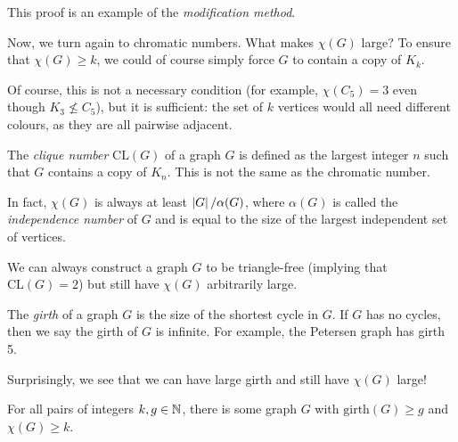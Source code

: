 \documentclass{article}
\begin{document}
\begin{note}
	This proof is an example of the \textit{modification method}.
\end{note}

Now, we turn again to chromatic numbers. What makes $\chi(G)$ large? To ensure that $\chi(G) \geq k$, we could of course simply force $G$ to contain a copy of $K_k$.

Of course, this is not a necessary condition (for example, $\chi(C_5) = 3$ even though $K_3 \not\leq C_5$), but it is sufficient: the set of $k$ vertices would all need different colours, as they are all pairwise adjacent.

\begin{definition}
    The \textit{clique number} $\mathrm{CL}(G)$ of a graph $G$ is defined as the largest integer $n$ such that $G$ contains a copy of $K_n$. This is not the same as the chromatic number.
    
    In fact, $\chi(G)$ is always at least $\left\lvert G \right\rvert / \alpha(G)$, where $\alpha(G)$ is called the \textit{independence number} of $G$ and is equal to the size of the largest independent set of vertices.
\end{definition}

\begin{note}
	We can always construct a graph $G$ to be triangle-free (implying that $\mathrm{CL}(G) = 2$) but still have $\chi(G)$ arbitrarily large.
\end{note}

\begin{definition}[Girth]
    The \textit{girth} of a graph $G$ is the size of the shortest cycle in $G$. If $G$ has no cycles, then we say the girth of $G$ is infinite. For example, the Petersen graph has girth 5.
\end{definition}

Surprisingly, we see that we can have large girth and still have $\chi(G)$ large!

\begin{theorem}
    For all pairs of integers $k, g \in \mathbb{N}$, there is some graph $G$ with $\mathrm{girth}(G) \geq g$ and $\chi(G) \geq k$.
\end{theorem}
\end{document}
